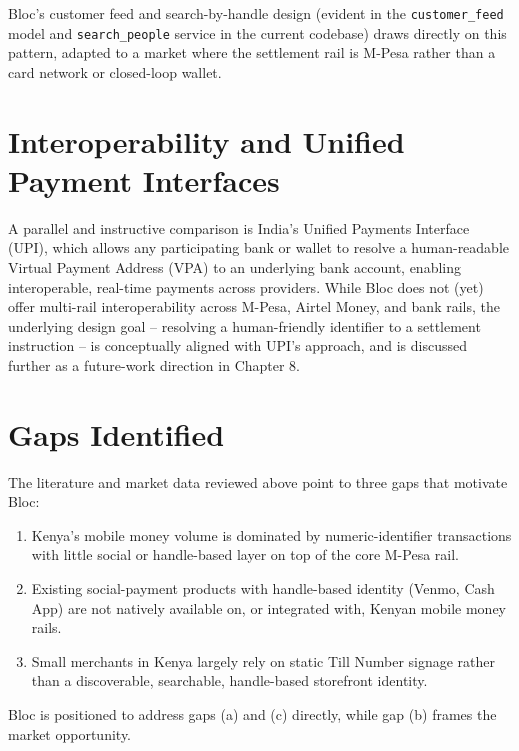 \documentclass[12pt, a4paper, twoside, openright]{report}
\begin{document}
Bloc's customer feed and search-by-handle design (evident in the \texttt{customer\_feed} model and \texttt{search\_people} service in the current codebase) draws directly on this pattern, adapted to a market where the settlement rail is M-Pesa rather than a card network or closed-loop wallet.

\section{Interoperability and Unified Payment Interfaces}

A parallel and instructive comparison is India's Unified Payments Interface (UPI), which allows any participating bank or wallet to resolve a human-readable Virtual Payment Address (VPA) to an underlying bank account, enabling interoperable, real-time payments across providers. While Bloc does not (yet) offer multi-rail interoperability across M-Pesa, Airtel Money, and bank rails, the underlying design goal -- resolving a human-friendly identifier to a settlement instruction -- is conceptually aligned with UPI's approach, and is discussed further as a future-work direction in Chapter 8.

\section{Gaps Identified}

The literature and market data reviewed above point to three gaps that motivate Bloc:

\begin{enumerate}
    \item[(a)] Kenya's mobile money volume is dominated by numeric-identifier transactions with little social or handle-based layer on top of the core M-Pesa rail.
    
    \item[(b)] Existing social-payment products with handle-based identity (Venmo, Cash App) are not natively available on, or integrated with, Kenyan mobile money rails.
    
    \item[(c)] Small merchants in Kenya largely rely on static Till Number signage rather than a discoverable, searchable, handle-based storefront identity.
\end{enumerate}

Bloc is positioned to address gaps (a) and (c) directly, while gap (b) frames the market opportunity.

\end{document}
